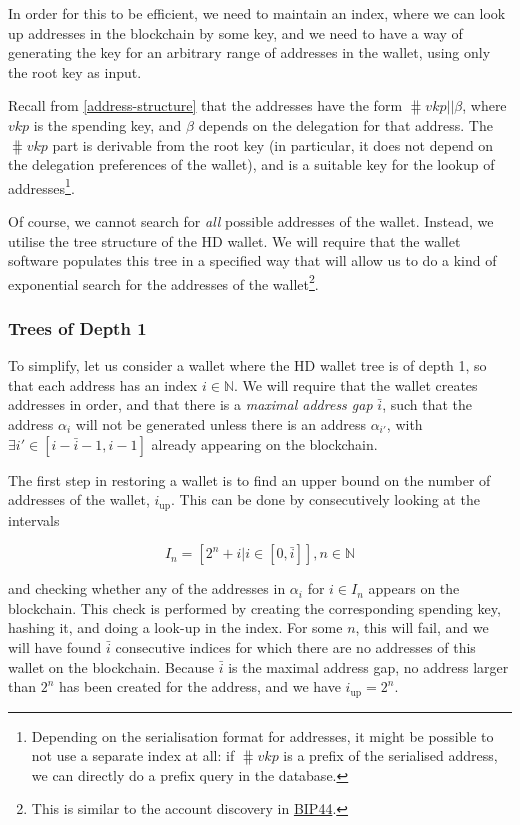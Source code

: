 \documentclass[11pt,a4paper,dvipsnames,twosided]{article}
\begin{document}
In order for this to be efficient, we need to maintain an index, where
we can look up addresses in the blockchain by some key, and we need to
have a way of generating the key for an arbitrary range of addresses in
the wallet, using only the root key as input.

Recall from \cref{address-structure} that the addresses have the form
\(\hash{vkp} \mathbin{||} \beta\), where \(vkp\) is the spending key, and
\(\beta\) depends on the delegation for that address. The
\(\hash{vkp}\) part is derivable from the root key (in
particular, it does not depend on the delegation preferences of the
wallet), and is a suitable key for the lookup of addresses\footnote{Depending
  on the serialisation format for addresses, it might be possible to not
  use a separate index at all: if \(\hash{vkp}\) is a prefix of
  the serialised address, we can directly do a prefix query in the
  database.}.

Of course, we cannot search for \emph{all} possible addresses of the
wallet. Instead, we utilise the tree structure of the HD wallet. We will
require that the wallet software populates this tree in a specified way
that will allow us to do a kind of exponential search for the addresses
of the wallet\footnote{This is similar to the account discovery
  in \href{https://github.com/bitcoin/bips/blob/master/bip-0044.mediawiki}{BIP44}.}.

\subsubsection{Trees of Depth 1}
\label{trees-of-depth-1}

To simplify, let us consider a wallet where the HD wallet tree is of
depth 1, so that each address has an index \(i \in \mathbb{N}\). We will
require that the wallet creates addresses in order, and that there is a
\emph{maximal address gap} \(\bar{i}\), such that the address
\(\alpha_i\) will not be generated unless there is an address
\(\alpha_{i'}\), with \(\exists i' \in [i-\bar{i}-1, i-1]\) already
appearing on the blockchain.

The first step in restoring a wallet is to find an upper bound on the
number of addresses of the wallet, \(i_{\text{up}}\). This can be done
by consecutively looking at the intervals

\[
I_{n} = [2^n + i | i \in [0, \bar{i}]], n \in \mathbb{N}
\]

and checking whether any of the addresses in \(\alpha_i\) for
\(i \in I_{n}\) appears on the blockchain. This check is performed by
creating the corresponding spending key, hashing it, and doing a look-up
in the index. For some \(n\), this will fail, and we will have found
\(\bar{i}\) consecutive indices for which there are no addresses of this
wallet on the blockchain. Because \(\bar{i}\) is the maximal address
gap, no address larger than \(2^n\) has been created for the address,
and we have \(i_\text{up} = 2^n\).
\end{document}
